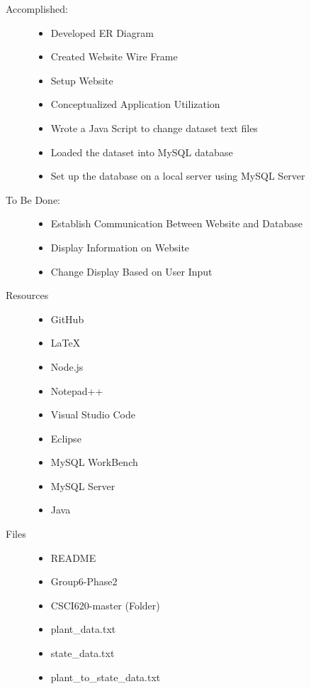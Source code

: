 \documentclass{Group6_Phase2}
\begin{document}
\begin{description}
	\item[Accomplished:] \hfill
	\begin{itemize}
		\item Developed ER Diagram
		\item Created Website Wire Frame
		\item Setup Website
		\item Conceptualized Application Utilization
		\item Wrote a Java Script to change dataset text files
		\item Loaded the dataset into MySQL database
		\item Set up the database on a local server using MySQL Server
	\end{itemize}
	
	\item[To Be Done:] \hfill
	\begin{itemize}
		\item Establish Communication Between Website and Database
		\item Display Information on Website
		\item Change Display Based on User Input
	\end{itemize}
	
	\item[Resources] \hfill
	\begin{itemize}
		\item GitHub
		\item LaTeX
		\item Node.js
		\item Notepad++
		\item Visual Studio Code
		\item Eclipse
		\item MySQL WorkBench
		\item MySQL Server
		\item Java
	\end{itemize}
	
	\item[Files] \hfill
	\begin{itemize}
		\item README
		\item Group6-Phase2
		\item CSCI620-master (Folder)
		\item plant\_data.txt
		\item state\_data.txt
		\item plant\_to\_state\_data.txt
	\end{itemize}
\end{description}
\end{document}
